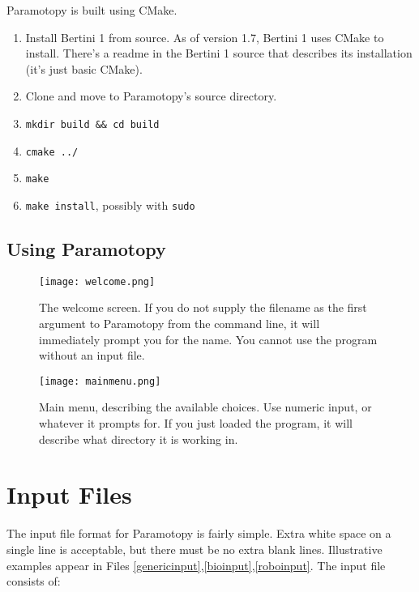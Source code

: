 Paramotopy is built using CMake.

\begin{enumerate}
	\item Install Bertini 1 from source.  As of version 1.7, Bertini 1 uses CMake to install.  There's a readme in the Bertini 1 source that describes its installation (it's just basic CMake).
	\item Clone and move to Paramotopy's source directory.
	\item \verb|mkdir build && cd build|
	\item \verb|cmake ../|
	\item \verb|make|
	\item \verb|make install|, possibly with \verb|sudo|
\end{enumerate}



\clearpage
\subsection{Using Paramotopy}
\label{sec:running}

\begin{figure}[h]
\begin{center}
\texttt{[image: welcome.png]}
\caption[Welcome Screen]{The welcome screen.  If you do not supply the filename as the first argument to Paramotopy from the command line, it will immediately prompt you for the name.  You cannot use the program without an input file.}
\label{screen:welcome}
\end{center}
\end{figure}



\begin{figure}[h]
\begin{center}
\texttt{[image: mainmenu.png]}
\caption[Main Menu]{Main menu, describing the available choices.  Use numeric input, or whatever it prompts for. If you just loaded the program, it will describe what directory it is working in.}
\label{screen:mainmenu}
\end{center}
\end{figure}



\clearpage
\section{Input Files}
\label{sec:input}

The input file format for Paramotopy is fairly simple.  Extra white space on a single line is acceptable, but there must be no extra blank lines.  Illustrative examples appear in Files \ref{genericinput},\ref{bioinput},\ref{roboinput}. The input file consists of:

